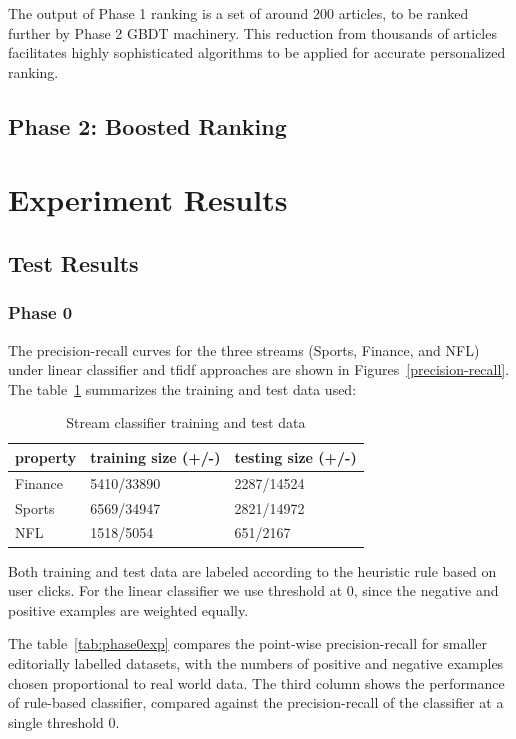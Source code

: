 \documentclass{sig-alternate}
\begin{document}
The output of Phase 1 ranking is a set of around 200 articles, to be ranked 
further by Phase 2 GBDT machinery. This reduction from thousands of articles 
facilitates highly sophisticated algorithms to be applied for accurate 
personalized ranking.

\subsection{Phase 2: Boosted Ranking}
\label{sec:phase2}



\section{Experiment Results}
\label{sec:experiments}

\subsection{Test Results}

\subsubsection{Phase 0}





The precision-recall curves for the three streams (Sports, Finance, and NFL) 
under linear classifier and tfidf approaches are shown in 
Figures~\ref{precision-recall}. The table~\ref{tab:precision} summarizes the 
training and test data used:
\begin{table}
\caption{Stream classifier training and test data}
\label{tab:precision}
\begin{tabular}{|l|l|l|}
\hline 
property & training size (+/-) & testing size (+/-) \\ \hline
Finance & 5410/33890 & 2287/14524\\ \hline
Sports & 6569/34947& 2821/14972\\ \hline
NFL & 1518/5054& 651/2167\\ \hline
\end{tabular}

\end{table}


Both training and test data are labeled according to the heuristic rule based 
on user clicks. For the linear classifier we use threshold at $0$, since the 
negative and positive examples are weighted equally. 


The table~\ref{tab:phase0exp} compares the point-wise precision-recall for 
smaller editorially labelled datasets, with the numbers of positive and 
negative examples chosen proportional to real world data. The third column 
shows the performance of rule-based classifier, compared against the 
precision-recall of the classifier at a single threshold $0$.
\end{document}
